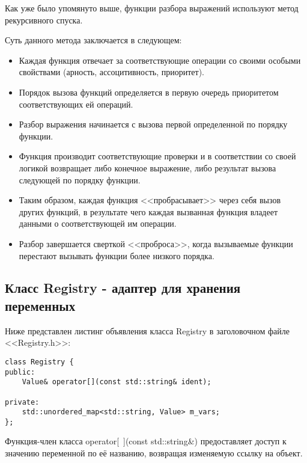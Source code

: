 Как уже было упомянуто выше, функции разбора выражений 
используют метод рекурсивного спуска.

Суть данного метода заключается в следующем:
\begin{itemize}
    \item Каждая функция отвечает за соответствующие
          операции со своими особыми свойствами
          (арность, ассоцитивность, приоритет).

    \item Порядок вызова функций определяется в первую
          очередь приоритетом соответствующих ей операций.

    \item Разбор выражения начинается с вызова
          первой определенной по порядку функции.

    \item Функция производит соответствующие проверки
          и в соответствии со своей логикой возвращает
          либо конечное выражение, либо результат вызова
          следующей по порядку функции.
          
    \item Таким образом, каждая функция <<пробрасывает>>
          через себя вызов других функций,
          в результате чего каждая вызванная функция
          владеет данными о соответствующей им операции.

    \item Разбор завершается сверткой <<проброса>>,
          когда вызываемые функции перестают вызывать 
          функции более низкого порядка.
\end{itemize}

\subsection{Класс Registry - адаптер для хранения переменных}

Ниже представлен листинг объявления класса Registry
в заголовочном файле <<Registry.h>>:

\begin{verbatim}
class Registry {
public:
    Value& operator[](const std::string& ident);

private:
    std::unordered_map<std::string, Value> m_vars;
};
\end{verbatim}

Функция-член класса operator[~](const std::string\&)
предоставляет доступ к значению переменной по её названию,
возвращая изменяемую ссылку на объект.

